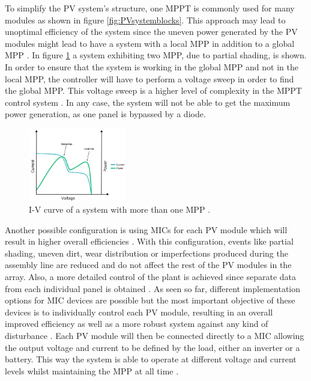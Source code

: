  To simplify the PV system's structure, one MPPT is commonly used for many modules as shown in figure \ref{fig:PVsystemblocks}. This approach may lead to unoptimal efficiency of the system since the uneven power generated by the PV modules might lead to have a system with a local MPP in addition to a global MPP \cite{AN1521_MC}. In figure \ref{multiple_local_MPP} a system exhibiting two MPP, due to partial shading, is shown. In order to ensure that the system is working in the global MPP and not in the local MPP, the controller will have to perform a voltage sweep in order to find the global MPP. This voltage sweep is a higher level of complexity in the MPPT control system \cite{AN1521_MC}. In any case, the system will not be able to get the maximum power generation, as one panel is bypassed by a diode.
\begin{figure}[H]
	\begin{center}
		\includegraphics[width=0.38\textwidth]{../Pictures/local_MPP}
		\caption{I-V curve of a system with more than one MPP \cite{local_mpp}.}
		\label{multiple_local_MPP}
	\end{center}	
\end{figure} 
Another possible configuration is using MICs for each PV module which will result in higher overall efficiencies \cite{ArchitectureMIC}. With this configuration, events like partial shading, uneven dirt, wear distribution or imperfections produced during the assembly line are reduced and do not affect the rest of the PV modules in the array. Also, a more detailed control of the plant is achieved since separate data from each individual panel is obtained \cite{ArchitectureMIC}.
As seen so far, different implementation options for MIC devices are possible but the most important objective of these devices is to individually control each PV module, resulting in an overall improved efficiency as well as a more robust system against any kind of disturbance \cite{ArchitectureMIC}. Each PV module will then be connected directly to a MIC allowing the output voltage and current to be defined by the load, either an inverter or a battery.  This way the system is able to operate at different voltage and current levels whilst maintaining the MPP at all time \cite{ArchitectureMIC}.


